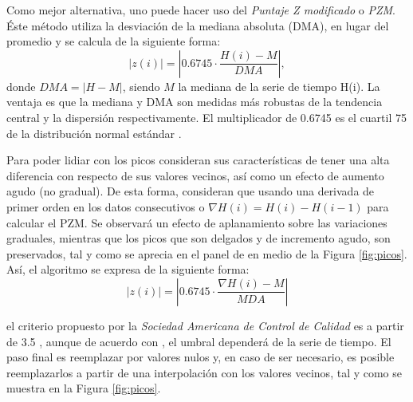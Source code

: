 Como mejor alternativa, uno puede hacer uso del \emph{Puntaje Z modificado} o \emph{PZM}. Éste método utiliza la desviación de la mediana absoluta (DMA), en lugar del promedio y se calcula de la siguiente forma:
\begin{equation}
    |z(i)| = | 0.6745 \cdot \frac{H(i) - M}{DMA}|,
\end{equation}
donde $DMA = |H-M|$, siendo $M$ la mediana de la serie de tiempo H(i). La ventaja es que la mediana y DMA son medidas más robustas de la tendencia central y la dispersión respectivamente. El multiplicador de 0.6745 es el cuartil 75 de la distribución normal estándar \cite{removing_with_Whitaker-Hayes}.

Para poder lidiar con los picos \cite{WHITAKER2018, removing_with_Whitaker-Hayes} consideran sus características de tener una alta diferencia con respecto de sus valores vecinos, así como un efecto de aumento agudo (no gradual). De esta forma, consideran que usando una derivada de primer orden en los datos consecutivos o $\nabla H(i) = H(i)- H(i-1)$ para calcular el PZM. Se observará un efecto de aplanamiento sobre las variaciones graduales, mientras que los picos que son delgados y de incremento agudo, son preservados, tal y como se aprecia en el panel de en medio de la Figura \ref{fig:picos}. Así, el algoritmo se expresa de la siguiente forma:
\begin{equation}
    |z(i)| = | 0.6745 \cdot \frac{\nabla H(i) - M}{MDA}|
\end{equation}

el criterio propuesto por la \emph{Sociedad Americana de Control de Calidad} es a partir de 3.5 , aunque de acuerdo con \cite{removing_with_Whitaker-Hayes}, el umbral dependerá de la serie de tiempo. El paso final es reemplazar por valores nulos y, en caso de ser necesario, es posible reemplazarlos a partir de una interpolación con los valores vecinos, tal y como se muestra en la Figura \ref{fig:picos}.

